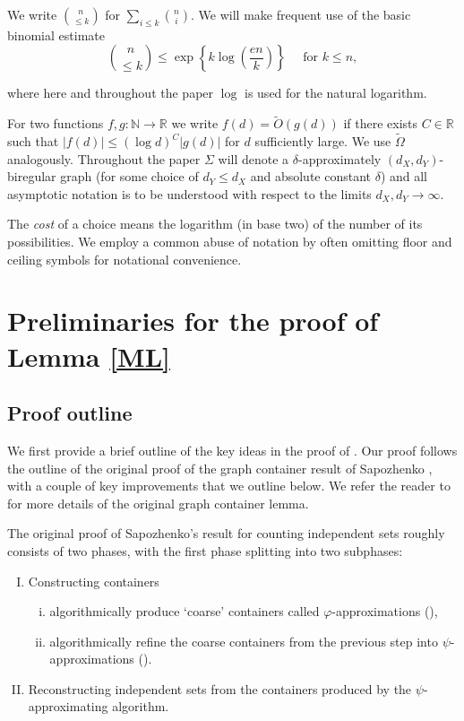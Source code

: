 \documentclass[a4paper]{amsart}
\theoremstyle{definition}
\newcommand{\beq}[1]{\begin{equation}\label{#1}}
\newcommand{\enq}[0]{\end{equation}}
\newcommand{\gd}[0]{\delta }
\newcommand{\nin}[0]{\noindent}
\newcommand{\0}[0]{\emptyset}
\begin{document}
We write $\binom{n}{\leq k}$ for $\sum_{i \le k}\binom{n}{i}.$ We will make frequent use of the basic binomial estimate 
\beq{binom} {n \choose \le k} \le \exp\left\{k \log \left(\frac{en}{k}\right)\right\} \quad \text{ for } k \le n, \enq

\nin where here and throughout the paper $\log$ is used for the natural logarithm.

For two functions $f,g:\mathbb{N}\to \mathbb{R}$ we write $f(d)= \tilde O(g(d))$ if there exists $C\in \mathbb{R}$ such that $|f(d)|\leq (\log d)^C |g(d)|$ for $d$ sufficiently large. We use $\tilde \Omega$ analogously. Throughout the paper $\Sigma$ will denote a $\gd$-approximately $(d_X, d_Y)$-biregular graph (for some choice of  $d_Y\leq d_X$ and absolute constant $\delta$) and all asymptotic notation is to be understood with respect to the limits $d_X,d_Y\to\infty$. 
 
The \emph{cost} of a choice means the logarithm (in base two) of the number of its possibilities.  We employ a common abuse of notation by often omitting floor and ceiling symbols for notational convenience.
\newline

\section{Preliminaries for the proof of Lemma \ref{ML}}\label{prelims}

\subsection{Proof outline}\label{sec.sketch} We first provide a brief outline of the key ideas in the proof of . Our proof follows the outline of the original proof of the graph container result of Sapozhenko \cite{sapocontainer}, with a couple of key improvements that we outline below. We refer the reader to \cite{Galvin_independent} for more details of the original graph container lemma.

 The original proof of Sapozhenko's result for counting independent sets roughly consists of two phases, with the first phase splitting into two subphases:
\begin{enumerate}[I.]
\item Constructing containers
\begin{enumerate}[(i)]
    \item algorithmically produce `coarse' containers called $\varphi$-approximations (),
    \item algorithmically refine the coarse containers from the previous step into $\psi$-approximations ().
\end{enumerate}
\item Reconstructing independent sets from the containers produced by the $\psi$-approximating algorithm.
\end{enumerate}
\end{document}
